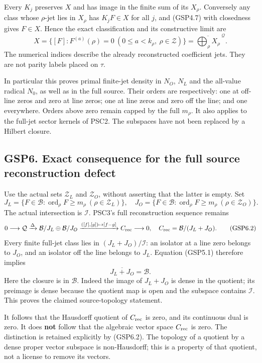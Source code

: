 Every \(K_j\) preserves \(X\) and has image in the finite sum of its
\(X_\rho\). Conversely any class whose \(\rho\)-jet lies in \(X_\rho\)
has \(K_jF\in X\) for all \(j\), and (GSP4.7) with closedness gives
\(F\in X\). Hence the exact classification and its constructive limit
are \[
\boxed{X=\{[F]:F^{(a)}(\rho)=0\ (0\le a<k_\rho,\ \rho\in\mathscr Z)\}
=\overline{\bigoplus_\rho X_\rho}^{\ \mathcal Q}.}
\tag{GSP5.3}
\] The numerical indices describe the already reconstructed coefficient
jets. They are not parity labels placed on \(\tau\).

In particular this proves primal finite-jet density in \(N_O\), \(N_L\)
and the all-value radical \(N_0\), as well as in the full source. Their
orders are respectively: one at off-line zeros and zero at line zeros;
one at line zeros and zero off the line; and one everywhere. Orders
above zero remain capped by the full \(m_\rho\). It also applies to the
full-jet sector kernels of PSC2. The subspaces have not been replaced by
a Hilbert closure.

\subsection{GSP6. Exact consequence for the full source reconstruction
defect}\label{gsp6.-exact-consequence-for-the-full-source-reconstruction-defect}

Use the actual sets \(\mathscr Z_L\) and \(\mathscr Z_O\), without
asserting that the latter is empty. Set \[
J_L=\{F\in\mathcal B:\operatorname{ord}_\rho F\ge m_\rho\ (\rho\in\mathscr Z_L)\},
\quad
J_O=\{F\in\mathcal B:\operatorname{ord}_\rho F\ge m_\rho\ (\rho\in\mathscr Z_O)\}.
\tag{GSP6.1}
\] The actual intersection is \(\mathcal I\). PSC3's full reconstruction
sequence remains \[
0\longrightarrow\mathcal Q\xrightarrow{\Delta}
\mathcal B/J_L\oplus\mathcal B/J_O
\xrightarrow{([f],[g])\mapsto[f-g]}C_{\rm rec}\longrightarrow0,
\quad C_{\rm rec}=\mathcal B/(J_L+J_O).
\tag{GSP6.2}
\] Every finite full-jet class lies in \((J_L+J_O)/\mathcal I\): an
isolator at a line zero belongs to \(J_O\), and an isolator off the line
belongs to \(J_L\). Equation (GSP5.1) therefore implies \[
\boxed{\overline{J_L+J_O}=\mathcal B.}
\tag{GSP6.3}
\] Here the closure is in \(\mathcal B\). Indeed the image of
\(J_L+J_O\) is dense in the quotient; its preimage is dense because the
quotient map is open and the subspace contains \(\mathcal I\). This
proves the claimed source-topology statement.

It follows that the Hausdorff quotient of \(C_{\rm rec}\) is zero, and
its continuous dual is zero. It does \textbf{not} follow that the
algebraic vector space \(C_{\rm rec}\) is zero. The distinction is
retained explicitly by (GSP6.2). The topology of a quotient by a dense
proper vector subspace is non-Hausdorff; this is a property of that
quotient, not a license to remove its vectors.

